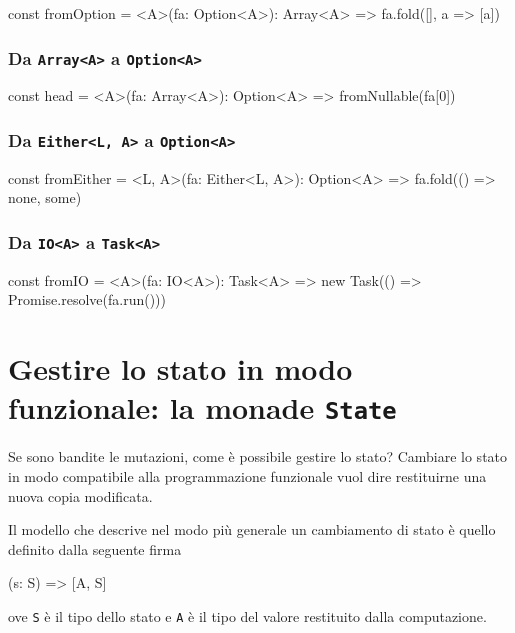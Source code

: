 \documentclass[12pt]{article}
\theoremstyle{definition}
\newenvironment{code}
  {\vspace{0.5cm} \VerbatimEnvironment\begin{typescriptcode}}
  {\end{typescriptcode} \vspace{0.2cm}}
\begin{document}
\begin{code}
const fromOption = <A>(fa: Option<A>): Array<A> =>
  fa.fold([], a => [a])
\end{code}

\subsubsection{Da \texttt{Array<A>} a \texttt{Option<A>}}

\begin{code}
const head = <A>(fa: Array<A>): Option<A> =>
  fromNullable(fa[0])
\end{code}

\subsubsection{Da \texttt{Either<L, A>} a \texttt{Option<A>}}

\begin{code}
const fromEither = <L, A>(fa: Either<L, A>): Option<A> =>
  fa.fold(() => none, some)
\end{code}

\subsubsection{Da \texttt{IO<A>} a \texttt{Task<A>}}

\begin{code}
const fromIO = <A>(fa: IO<A>): Task<A> =>
  new Task(() => Promise.resolve(fa.run()))
\end{code}

\newpage

\section{Gestire lo stato in modo funzionale: la monade \texttt{State}}

Se sono bandite le mutazioni, come è possibile gestire lo stato?
Cambiare lo stato in modo compatibile alla programmazione funzionale vuol dire restituirne una nuova copia modificata.

Il modello che descrive nel modo più generale un cambiamento di stato è quello definito dalla seguente firma

\begin{code}
(s: S) => [A, S]
\end{code}

ove \texttt{S} è il tipo dello stato e \texttt{A} è il tipo del valore restituito dalla computazione.
\end{document}
